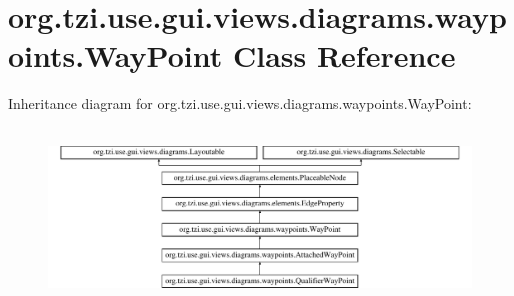 \hypertarget{classorg_1_1tzi_1_1use_1_1gui_1_1views_1_1diagrams_1_1waypoints_1_1_way_point}{\section{org.\-tzi.\-use.\-gui.\-views.\-diagrams.\-waypoints.\-Way\-Point Class Reference}
\label{classorg_1_1tzi_1_1use_1_1gui_1_1views_1_1diagrams_1_1waypoints_1_1_way_point}
}
Inheritance diagram for org.\-tzi.\-use.\-gui.\-views.\-diagrams.\-waypoints.\-Way\-Point\-:\begin{figure}[H]
\begin{center}
\leavevmode
\includegraphics[height=4.692738cm]{classorg_1_1tzi_1_1use_1_1gui_1_1views_1_1diagrams_1_1waypoints_1_1_way_point}
\end{center}
\end{figure}
